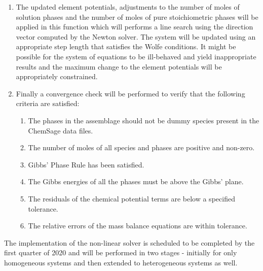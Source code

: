 \begin{enumerate}
			\item The updated element potentials, adjustments to the number of moles of solution phases and the number of moles of pure stoichiometric phases will be applied in this function which will performs a line search using the direction vector computed by the Newton solver.  The system will be updated using an appropriate step length that satisfies the Wolfe conditions.  It might be possible for the system of equations to be ill-behaved and yield inappropriate results and the maximum change to the element potentials will be appropriately constrained.
			 \item Finally a convergence check will be performed to verify that the following criteria are satisfied:
			 \begin{enumerate}
			 	\item The phases in the assemblage should not be dummy species present in the ChemSage data files.
				\item The number of moles of all species and phases are positive and non-zero.
				\item Gibbs' Phase Rule has been satisfied.
				\item The Gibbs energies of all the phases must be above the Gibbs' plane.
				\item The residuals of the chemical potential terms are below a specified tolerance.
				\item The relative errors of the mass balance equations are within tolerance.
			\end{enumerate}
		\end{enumerate}
	The implementation of the non-linear solver is scheduled to be completed by the first quarter of 2020 and will be performed in two stages - initially for only homogeneous systems and then extended to heterogeneous systems as well.

